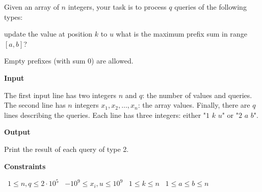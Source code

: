 Given an array of $n$ integers, your task is to process $q$ queries of the following types:

update the value at position $k$ to $u$
what is the maximum prefix sum in range $[a,b]$?

Empty prefixes (with sum 0) are allowed.

\vspace{0.3cm}\noindent\textbf{Input}

The first input line has two integers $n$ and $q$: the number of values and queries.
The second line has $n$ integers $x_1,x_2,\dots,x_n$: the array values.
Finally, there are $q$ lines describing the queries. Each line has three integers: either "$1$ $k$ $u$" or "$2$ $a$ $b$".

\vspace{0.3cm}\noindent\textbf{Output}

Print the result of each query of type 2.

\vspace{0.3cm}\noindent\textbf{Constraints}

\textbullet\ $1 \le n,q \le 2 \cdot 10^5$
\textbullet\ $-10^9 \le x_i, u \le 10^9$
\textbullet\ $1 \le k \le n$
\textbullet\ $1 \le a \le b \le n$
